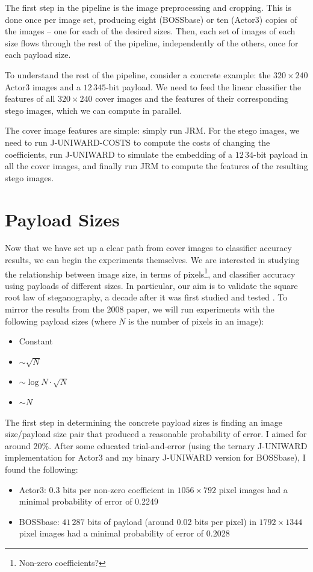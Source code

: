 \documentclass[11pt,a4paper,twoside,openright]{report}
\begin{document}
The first step in the pipeline is the image preprocessing and cropping. This is done once per image set, producing eight (BOSSbase) or ten (Actor3) copies of the images -- one for each of the desired sizes. Then, each set of images of each size flows through the rest of the pipeline, independently of the others, once for each payload size.

To understand the rest of the pipeline, consider a concrete example: the $320\times240$ Actor3 images and a $12\,345$-bit payload. We need to feed the linear classifier the features of all $320\times240$ cover images and the features of their corresponding stego images, which we can compute in parallel.

The cover image features are simple: simply run JRM. For the stego images, we need to run J-UNIWARD-COSTS to compute the costs of changing the coefficients, run J-UNIWARD to simulate the embedding of a $12\,34$-bit payload in all the cover images, and finally run JRM to compute the features of the resulting stego images.


\section{Payload Sizes} \label{sec:payload-sizes}

Now that we have set up a clear path from cover images to classifier accuracy results, we can begin the experiments themselves. We are interested in studying the relationship between image size, in terms of pixels\footnote{Non-zero coefficients?}, and classifier accuracy using payloads of different sizes. In particular, our aim is to validate the square root law of steganography, a decade after it was first studied and tested \cite{2008-paper}. To mirror the results from the 2008 paper, we will run experiments with the following payload sizes (where $N$ is the number of pixels in an image):
\begin{itemize}
    \item Constant
    \item $\sim \sqrt{N}$
    \item $\sim \log{N}\cdot\sqrt{N}$
    \item $\sim N$
\end{itemize}

The first step in determining the concrete payload sizes is finding an image size/payload size pair that produced a reasonable probability of error. I aimed for around 20\%. After some educated trial-and-error (using the ternary J-UNIWARD implementation for Actor3 and my binary J-UNIWARD version for BOSSbase), I found the following:
\begin{itemize}
    \item Actor3: 0.3 bits per non-zero coefficient in $1056\times792$ pixel images had a minimal probability of error of 0.2249
    \item BOSSbase: $41\,287$ bits of payload (around 0.02 bits per pixel) in $1792\times1344$ pixel images had a minimal probability of error of 0.2028
\end{itemize}
\end{document}
